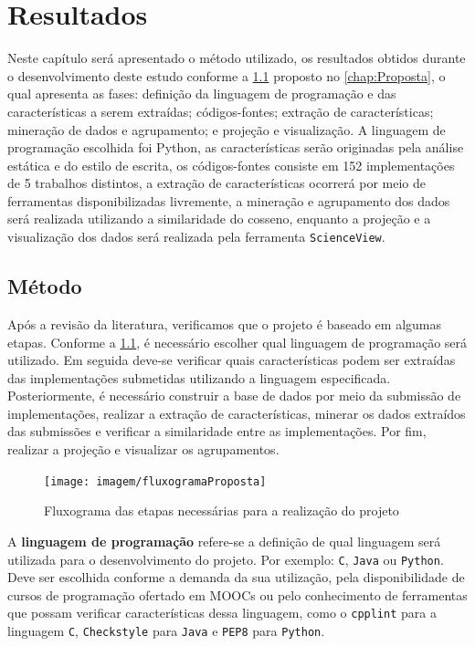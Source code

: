 \chapter{Resultados}
\label{chap:Result}

	Neste capítulo será apresentado o método utilizado, os resultados obtidos durante o desenvolvimento
	deste estudo conforme a \cref{fig:fluxogramaProposta} proposto no \cref{chap:Proposta},
	o qual apresenta as fases: definição da linguagem de programação e das características
	a serem extraídas; códigos-fontes; extração de características; mineração de dados e
	agrupamento; e projeção e visualização. A linguagem de programação escolhida foi Python,
	as características serão originadas pela análise estática e do estilo de escrita,
	os códigos-fontes consiste em 152 implementações de 5 trabalhos distintos, a extração
	de características ocorrerá por meio de ferramentas disponibilizadas livremente, a
	mineração e agrupamento dos dados será realizada utilizando a similaridade do
	cosseno, enquanto a projeção e a visualização dos dados será realizada pela ferramenta
	\texttt{ScienceView}.
	 
 	\section{Método}
	 	Após a revisão da literatura, verificamos que o projeto é baseado em algumas etapas.
	 	Conforme a \cref{fig:fluxogramaProposta}, é necessário escolher qual linguagem de programação
	 	será utilizado. Em seguida deve-se verificar quais características podem ser extraídas
	 	das implementações submetidas utilizando a linguagem especificada. Posteriormente, é
	 	necessário construir a base de dados por meio da submissão de implementações, realizar
	 	a extração de características, minerar os dados extraídos das submissões e verificar a
	 	similaridade entre as implementações. Por fim, realizar a projeção e visualizar os
	 	agrupamentos.
	 	
	 	\begin{figure}[h]
	 		\centering
	 		\texttt{[image: imagem/fluxogramaProposta]}
	 		\caption{Fluxograma das etapas necessárias para a realização do projeto}
	 		\label{fig:fluxogramaProposta}
	 	\end{figure}
	 	
	 	A \textbf{linguagem de programação} refere-se a definição de qual linguagem será
	 	utilizada para o desenvolvimento do projeto. Por exemplo: \texttt{C}, \texttt{Java}
	 	ou \texttt{Python}. Deve ser escolhida conforme a demanda da sua utilização, pela
	 	disponibilidade de cursos de programação ofertado em \acs{MOOC}s ou pelo conhecimento de
	 	ferramentas que possam verificar características dessa linguagem, como o
	 	\texttt{cpplint} para a linguagem \texttt{C}, \texttt{Checkstyle} para
	 	\texttt{Java} e \texttt{PEP8} para \texttt{Python}.
	 	
